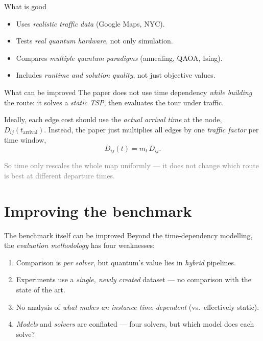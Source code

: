 \documentclass[
11pt,notheorems,hyperref={pdfauthor=Alma Arevalo Loyola}
]{beamer}
\renewcommand{\emphasize}[1]{\textcolor{emphasisblue}{\textit{#1}}}
\newcommand{\emphteal}[1]{\textcolor{emphasisteal}{\textit{#1}}}
\begin{document}
\begin{frame}{What is good}
  \begin{itemize}
    \item[\textcolor{emphasisteal}{\checkmark}] Uses \emphasize{realistic traffic data} (Google Maps, NYC).
    \item[\textcolor{emphasisteal}{\checkmark}] Tests \emphasize{real quantum hardware}, not only simulation.
    \item[\textcolor{emphasisteal}{\checkmark}] Compares \emphasize{multiple quantum paradigms} (annealing, QAOA, Ising).
    \item[\textcolor{emphasisteal}{\checkmark}] Includes \emphasize{runtime and solution quality}, not just objective values.
  \end{itemize}
\end{frame}

\begin{frame}{What can be improved}
  \small
  The paper does \alert{not} use time dependency \emphteal{while building} the route: it solves a \emphteal{static TSP}, then evaluates the tour under traffic.
  \vspace{0.4em}

  Ideally, each edge cost should use the \emphasize{actual arrival time} at the node, $D_{ij}(t_{\text{arrival}})$. Instead, the paper just multiplies all edges by one \emphasize{traffic factor} per time window,
  \[
    D_{ij}(t) = m_t \, D_{ij}.
  \]
  \vspace{0.3em}

  \textcolor{gray}{So time only rescales the whole map uniformly --- it does not change which route is best at different departure times.}
\end{frame}

\section{Improving the benchmark}

\begin{frame}{The benchmark itself can be improved}
  \small
  Beyond the time-dependency modelling, the \emphteal{evaluation methodology} has four weaknesses:
  \begin{enumerate}\setlength{\itemsep}{4pt}
    \item Comparison is \emphasize{per solver}, but quantum's value lies in \emphasize{hybrid} pipelines.
    \item Experiments use a \emphasize{single, newly created} dataset --- no comparison with the state of the art.
    \item No analysis of \emphasize{what makes an instance time-dependent} (vs.\ effectively static).
    \item \emphasize{Models} and \emphasize{solvers} are conflated --- four solvers, but which model does each solve?
  \end{enumerate}
\end{frame}
\end{document}
